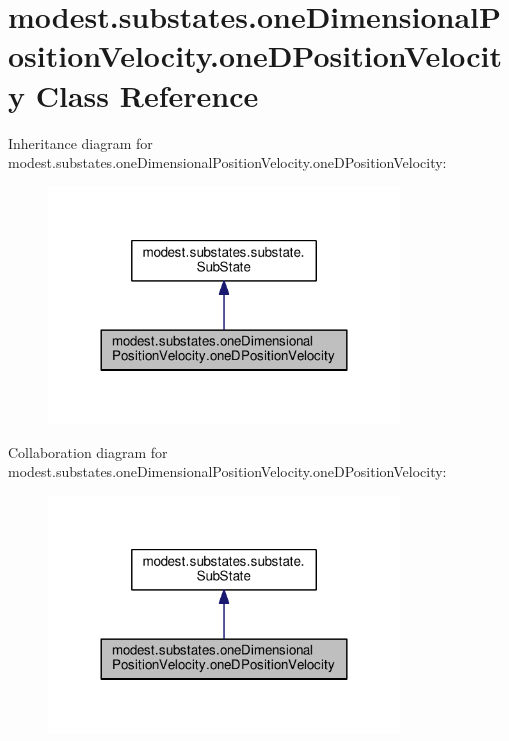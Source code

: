\hypertarget{classmodest_1_1substates_1_1oneDimensionalPositionVelocity_1_1oneDPositionVelocity}{}\section{modest.\+substates.\+one\+Dimensional\+Position\+Velocity.\+one\+D\+Position\+Velocity Class Reference}
\label{classmodest_1_1substates_1_1oneDimensionalPositionVelocity_1_1oneDPositionVelocity}


Inheritance diagram for modest.\+substates.\+one\+Dimensional\+Position\+Velocity.\+one\+D\+Position\+Velocity\+:
\nopagebreak
\begin{figure}[H]
\begin{center}
\leavevmode
\includegraphics[width=264pt]{classmodest_1_1substates_1_1oneDimensionalPositionVelocity_1_1oneDPositionVelocity__inherit__graph}
\end{center}
\end{figure}


Collaboration diagram for modest.\+substates.\+one\+Dimensional\+Position\+Velocity.\+one\+D\+Position\+Velocity\+:
\nopagebreak
\begin{figure}[H]
\begin{center}
\leavevmode
\includegraphics[width=264pt]{classmodest_1_1substates_1_1oneDimensionalPositionVelocity_1_1oneDPositionVelocity__coll__graph}
\end{center}
\end{figure}
